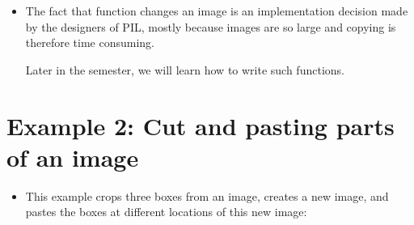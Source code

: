 \documentclass[letterpaper,10pt,english]{sphinxmanual}
\begin{document}
\begin{itemize}
\item {} 
The fact that function  changes an image is an
implementation decision made by the designers of PIL, mostly
because images are so large and copying is therefore time
consuming.

Later in the semester, we will learn how to write such functions.

\end{itemize}


\section{Example 2: Cut and pasting parts of an image}
\label{\detokenize{lecture_notes/lec07_modules_images:example-2-cut-and-pasting-parts-of-an-image}}\begin{itemize}
\item {} 
This example crops three boxes from an image, creates a new image, and
pastes the boxes at different locations of this new image:

\begin{sphinxVerbatim}[commandchars=\\\{\}]
   

  
   

       
           
         

    


\end{sphinxVerbatim}
\end{itemize}
\end{document}
